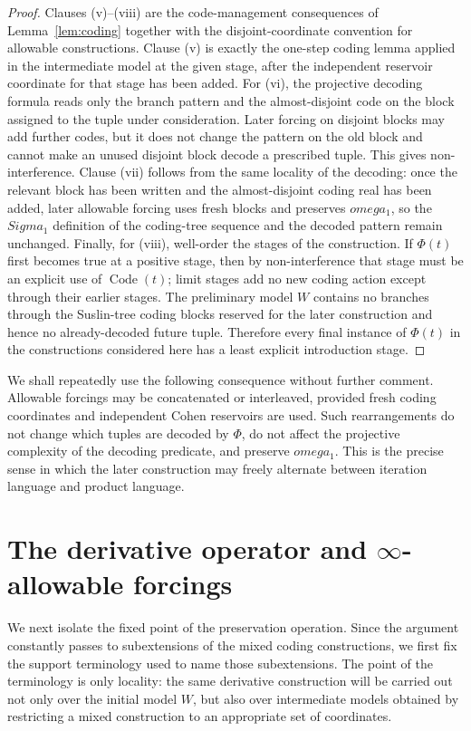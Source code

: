 \documentclass{article}
\theoremstyle{remark}
\theoremstyle{plain}
\newcommand{\Code}{\operatorname{Code}}
\def\Sigma{Sigma}%
\def\omega{omega}%
\begin{document}
\begin{proof}
Clauses (v)--(viii) are the code-management consequences of Lemma~\ref{lem:coding} together with the disjoint-coordinate convention for allowable constructions. Clause (v) is exactly the one-step coding lemma applied in the intermediate model at the given stage, after the independent reservoir coordinate for that stage has been added. For (vi), the projective decoding formula reads only the branch pattern and the almost-disjoint code on the block assigned to the tuple under consideration. Later forcing on disjoint blocks may add further codes, but it does not change the pattern on the old block and cannot make an unused disjoint block decode a prescribed tuple. This gives non-interference. Clause (vii) follows from the same locality of the decoding: once the relevant block has been written and the almost-disjoint coding real has been added, later allowable forcing uses fresh blocks and preserves $\omega_1$, so the $\Sigma_1$ definition of the coding-tree sequence and the decoded pattern remain unchanged. Finally, for (viii), well-order the stages of the construction. If $\Phi(t)$ first becomes true at a positive stage, then by non-interference that stage must be an explicit use of $\Code(t)$; limit stages add no new coding action except through their earlier stages. The preliminary model $W$ contains no branches through the Suslin-tree coding blocks reserved for the later construction and hence no already-decoded future tuple. Therefore every final instance of $\Phi(t)$ in the constructions considered here has a least explicit introduction stage.
\end{proof}


We shall repeatedly use the following consequence without further comment. Allowable forcings may be concatenated or interleaved, provided fresh coding coordinates and independent Cohen reservoirs are used. Such rearrangements do not change which tuples are decoded by $\Phi$, do not affect the projective complexity of the decoding predicate, and preserve $\omega_1$. This is the precise sense in which the later construction may freely alternate between iteration language and product language.


\section{The derivative operator and \texorpdfstring{$\infty$}{infinity}-allowable forcings}\label{sec:derivative}

We next isolate the fixed point of the preservation operation. Since the
argument constantly passes to subextensions of the mixed coding constructions,
we first fix the support terminology used to name those subextensions. The
point of the terminology is only locality: the same derivative construction will
be carried out not only over the initial model $W$, but also over intermediate
models obtained by restricting a mixed construction to an appropriate set of
coordinates.
\end{document}
